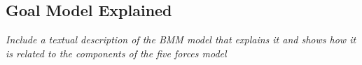 \documentclass{article}
\begin{document}
\subsection{Goal Model Explained}
\textit{
Include a textual description of the BMM model that explains it and shows how
it is related to the components of the five forces model
}




\end{document}
